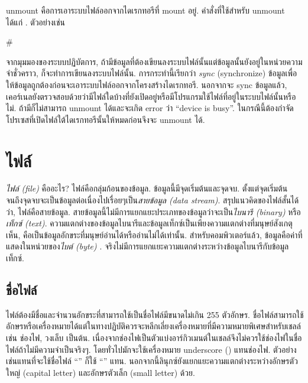 \begin{thwbr}
\bigskip
unmount คือการเอาระบบไฟล์ออกจากไดเรกทอรีที่ mount อยู่. คำสั่งที่ใช้สำหรับ unmount ได้แก่ . ตัวอย่างเช่น 
\begin{MyExample}
\begin{MyEx}
# 
\end{MyEx}
\end{MyExample}
จากมุมมองของระบบปฏิบัตการ, ถ้ามีข้อมูลที่ต้องเขียนลงระบบไฟล์นั้นแต่ข้อมูลนั้นยังอยู่ในหน่วยความจำชั่วคราว, ก็จะทำการเขียนลงระบบไฟล์นั้น. การกระทำนี้เรียกว่า \emph{sync} (synchronize) ข้อมูลเพื่อให้ข้อมูลถูกต้องก่อนจะเอาระบบไฟล์ออกจากโครงสร้างไดเรกทอรี. นอกจากจะ sync ข้อมูลแล้ว, เคอร์เนลยังตรวจสอบด้วยว่ามีไฟล์ใดบ้างที่ยังเปิดอยู่หรือมีโปรแกรมใช้ไฟล์ที่อยู่ในระบบไฟล์นั้นหรือไม่. ถ้ามีก็ไม่สามารถ unmount ได้และจะเกิด error ว่า ``device is busy''. ในกรณีนี้ต้องกำจัดโปรเซสที่เปิดไฟล์ใต้ไดเรกทอรีนั้นให้หมดก่อนจึงจะ unmount ได้.

\section{ไฟล์}
\emph{ไฟล์ (file)} %
%
คืออะไร? ไฟล์คือกลุ่มก้อนของข้อมูล. ข้อมูลนี้มีจุดเริ่มต้นและจุดจบ. ตั้งแต่จุดเริ่มต้นจนถึงจุดจบจะเป็นข้อมูลต่อเนื่องไปเรื่อยๆเป็น\emph{สายข้อมูล (data stream)}. สรุปแนวคิดของไฟล์สั้นได้ว่า, ไฟล์คือสายข้อมูล. สายข้อมูลนี้ไม่มีการแยกแยะประเภทของข้อมูลว่าจะเป็น\emph{ไบนารี (binary)} หรือ\emph{เท็กซ์ (text)}. ความแตกต่างของข้อมูลไบนารีและข้อมูลเท็กซ์เป็นเพียงความแตกต่างที่มนุษย์สังเกตุเห็น, คือเป็นข้อมูลอักขระที่มนุษย์อ่านได้หรืออ่านไม่ได้เท่านั้น. สำหรับคอมพิวเตอร์แล้ว, ข้อมูลคือค่าที่แสดงในหน่วยของ\emph{ไบต์ (byte)} %
.%
จริงไม่มีการแยกแยะความแตกต่างระหว่างข้อมูลไบนารีกับข้อมูลเท็กซ์.

\subsection{ชื่อไฟล์}
ไฟล์ต้องมีชื่อและจำนวนอักขระที่สามารถใช้เป็นชื่อไฟล์มีขนาดไม่เกิน 255 ตัวอักษร. ชื่อไฟล์สามารถใช้อักษรหรือเครื่องหมายได้แต่ในทางปฏิบัติควรจะหลีกเลี่ยงเครื่องหมายที่มีความหมายพิเศษสำหรับเชลล์เช่น ช่องไฟ, วงเล็บ \cmd{()} เป็นต้น. เนื่องจากช่องไฟเป็นตัวแบ่งอาร์กิวเมนต์ในเชลล์จึงไม่ควรใช้ช่องไฟในชื่อไฟล์ถ้าไม่มีความจำเป็นจริงๆ. โดยทั่วไปมักจะใช้เครื่องหมาย underscore (\cmd{\_}) แทนช่องไฟ. ตัวอย่างเช่นแทนที่จะใช้ชื่อไฟล์ ``'' ก็ใช้ ``'' แทน. นอกจากนี้ลินุกซ์ยังแยกแยะความแตกต่างระหว่างอักษรตัวใหญ่ (capital letter) และอักษรตัวเล็ก (small letter) ด้วย.


\end{thwbr}
